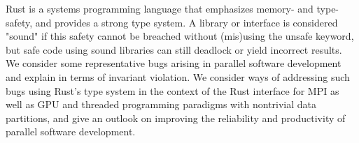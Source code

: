 Rust is a systems programming language that emphasizes memory- and type-safety, and provides a strong type system. A library or interface is considered "sound" if this safety cannot be breached without (mis)using the unsafe keyword, but safe code using sound libraries can still deadlock or yield incorrect results. We consider some representative bugs arising in parallel software development and explain in terms of invariant violation. We consider ways of addressing such bugs using Rust's type system in the context of the Rust interface for MPI as well as GPU and threaded programming paradigms with nontrivial data partitions, and give an outlook on improving the reliability and productivity of parallel software development.
